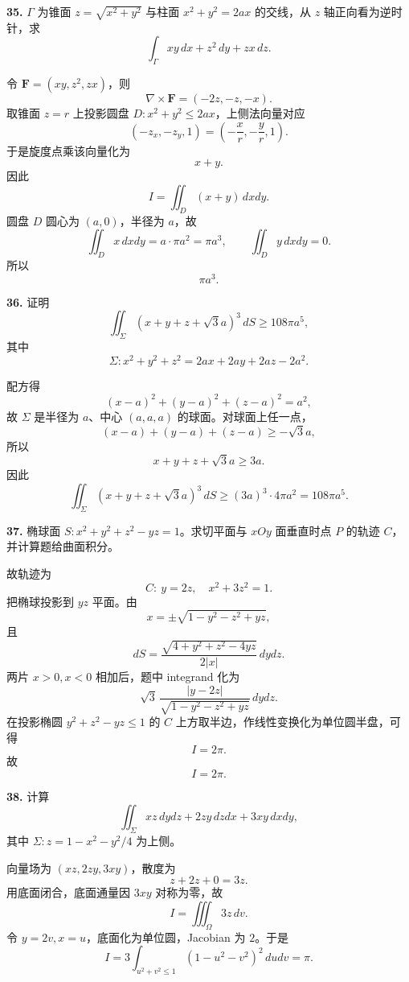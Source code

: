 \begin{problemblock}
\textbf{35.} \(\Gamma\) 为锥面 \(z=\sqrt{x^2+y^2}\) 与柱面 \(x^2+y^2=2ax\) 的交线，从 \(z\) 轴正向看为逆时针，求
\[
\int_\Gamma xy\,dx+z^2\,dy+zx\,dz.
\]
\end{problemblock}
\begin{solutionblock}
令 \(\boldsymbol F=(xy,z^2,zx)\)，则
\[
\nabla\times\boldsymbol F=(-2z,-z,-x).
\]
取锥面 \(z=r\) 上投影圆盘 \(D:x^2+y^2\le2ax\)，上侧法向量对应
\[
(-z_x,-z_y,1)=\left(-\frac{x}{r},-\frac{y}{r},1\right).
\]
于是旋度点乘该向量化为
\[
x+y.
\]
因此
\[
I=\iint_D(x+y)\,dxdy.
\]
圆盘 \(D\) 圆心为 \((a,0)\)，半径为 \(a\)，故
\[
\iint_Dx\,dxdy=a\cdot\pi a^2=\pi a^3,\qquad
\iint_Dy\,dxdy=0.
\]
所以
\[
\boxed{\pi a^3}.
\]
\end{solutionblock}

\begin{problemblock}
\textbf{36.} 证明
\[
\iint_\Sigma (x+y+z+\sqrt3a)^3\,dS\ge108\pi a^5,
\]
其中
\[
\Sigma:x^2+y^2+z^2=2ax+2ay+2az-2a^2.
\]
\end{problemblock}
\begin{solutionblock}
配方得
\[
(x-a)^2+(y-a)^2+(z-a)^2=a^2,
\]
故 \(\Sigma\) 是半径为 \(a\)、中心 \((a,a,a)\) 的球面。对球面上任一点，
\[
(x-a)+(y-a)+(z-a)\ge-\sqrt3a,
\]
所以
\[
x+y+z+\sqrt3a\ge3a.
\]
因此
\[
\iint_\Sigma (x+y+z+\sqrt3a)^3\,dS
\ge (3a)^3\cdot4\pi a^2
=\boxed{108\pi a^5}.
\]
\end{solutionblock}

\begin{problemblock}
\textbf{37.} 椭球面 \(S:x^2+y^2+z^2-yz=1\)。求切平面与 \(xOy\) 面垂直时点 \(P\) 的轨迹 \(C\)，并计算题给曲面积分。
\end{problemblock}
\begin{solutionblock}
故轨迹为
\[
\boxed{C:\ y=2z,\quad x^2+3z^2=1}.
\]
把椭球投影到 \(yz\) 平面。由
\[
x=\pm\sqrt{1-y^2-z^2+yz},
\]
且
\[
dS=\frac{\sqrt{4+y^2+z^2-4yz}}{2|x|}\,dydz.
\]
两片 \(x>0,x<0\) 相加后，题中 integrand 化为
\[
\sqrt3\,\frac{|y-2z|}{\sqrt{1-y^2-z^2+yz}}\,dydz.
\]
在投影椭圆 \(y^2+z^2-yz\le1\) 的 \(C\) 上方取半边，作线性变换化为单位圆半盘，可得
\[
I=2\pi.
\]
故
\[
\boxed{I=2\pi}.
\]
\end{solutionblock}

\begin{problemblock}
\textbf{38.} 计算
\[
\iint_\Sigma xz\,dydz+2zy\,dzdx+3xy\,dxdy,
\]
其中 \(\Sigma:z=1-x^2-y^2/4\) 为上侧。
\end{problemblock}
\begin{solutionblock}
向量场为 \((xz,2zy,3xy)\)，散度为
\[
z+2z+0=3z.
\]
用底面闭合，底面通量因 \(3xy\) 对称为零，故
\[
I=\iiint_\Omega3z\,dv.
\]
令 \(y=2v,x=u\)，底面化为单位圆，Jacobian 为 \(2\)。于是
\[
I=3\int_{u^2+v^2\le1}(1-u^2-v^2)^2\,dudv
=\boxed{\pi}.
\]
\end{solutionblock}

